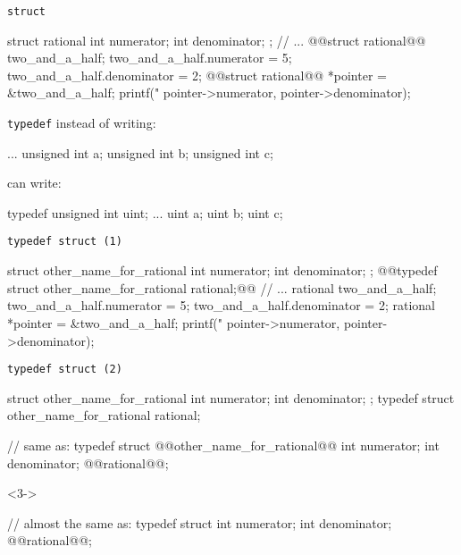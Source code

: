 \usetikzlibrary{fit,positioning,matrix}

\begin{frame}[label=struct,fragile]{\tt struct}
\small
\begin{ccodeNL}
struct rational {
    int numerator;
    int denominator;
};
// ...
@@struct rational@@ two_and_a_half;
two_and_a_half.numerator = 5;
two_and_a_half.denominator = 2;
@@struct rational@@ *pointer = &two_and_a_half;
printf("%
       pointer->numerator,
       pointer->denominator);
\end{ccodeNL}
\end{frame}

\begin{frame}[fragile,label=typedef]{\tt typedef}
instead of writing:
\begin{ccodeNL}
...
unsigned int a;
unsigned int b;
unsigned int c;
\end{ccodeNL}
can write:
\begin{ccodeNL}
typedef unsigned int uint;
...
uint a;
uint b;
uint c;
\end{ccodeNL}
\end{frame}

\begin{frame}[fragile,label=typedefStruct1]{\tt typedef struct (1)}
\small
{}
\begin{ccodeNL}
struct other_name_for_rational {
    int numerator;
    int denominator;
};
@@typedef struct other_name_for_rational rational;@@
// ...
rational two_and_a_half;
two_and_a_half.numerator = 5;
two_and_a_half.denominator = 2;
rational *pointer = &two_and_a_half;
printf("%
       pointer->numerator,
       pointer->denominator);
\end{ccodeNL}
\end{frame}

\begin{frame}[fragile,label=typedefStruct2]{\tt typedef struct (2)}
\vspace{-8mm}
\begin{ccodeS}
struct other_name_for_rational {
    int numerator;
    int denominator;
};
typedef struct other_name_for_rational rational;
\end{ccodeS}
\vspace{-1mm}
\begin{ccodeS}
// same as:
typedef struct @@other_name_for_rational@@ {
    int numerator;
    int denominator;
} @@rational@@;
\end{ccodeS}
\vspace{-1mm}
\begin{visibleenv}<3->
\begin{ccodeS}
// almost the same as:
typedef struct {
    int numerator;
    int denominator;
} @@rational@@;
\end{ccodeS}
\end{visibleenv}
\end{frame}



